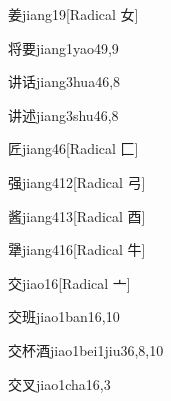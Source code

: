 \begin{verbete}{姜}{jiang1}{9}[Radical 女]
\end{verbete}

\begin{verbete}{将要}{jiang1yao4}{9,9}
\end{verbete}

\begin{verbete}{讲话}{jiang3hua4}{6,8}
\end{verbete}

\begin{verbete}{讲述}{jiang3shu4}{6,8}
\end{verbete}

\begin{verbete}{匠}{jiang4}{6}[Radical 匚]
\end{verbete}

\begin{verbete}{强}{jiang4}{12}[Radical 弓]
\end{verbete}

\begin{verbete}{酱}{jiang4}{13}[Radical 酉]
\end{verbete}

\begin{verbete}{犟}{jiang4}{16}[Radical 牛]
\end{verbete}

\begin{verbete}{交}{jiao1}{6}[Radical 亠]
\end{verbete}

\begin{verbete}{交班}{jiao1ban1}{6,10}
\end{verbete}

\begin{verbete}{交杯酒}{jiao1bei1jiu3}{6,8,10}
\end{verbete}

\begin{verbete}{交叉}{jiao1cha1}{6,3}
\end{verbete}

